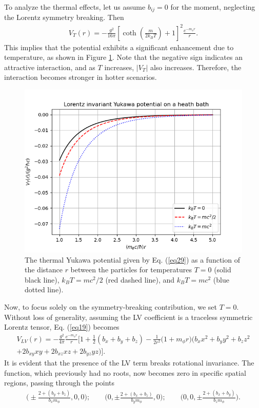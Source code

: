 \documentclass[11pt,showpacs,preprintnumbers,amsmath,amssymb,prd,nofootinbib,superscriptaddress]{revtex4-2}
\begin{document}
{To analyze the thermal effects, let us assume $b_{ij} = 0$ for the moment, neglecting the Lorentz symmetry breaking. Then
\begin{eqnarray}
    V_T(r)=-\frac{g^2 }{16\pi}\left[\coth{\left(\frac{m}{2k_BT}\right)}+1\right]^2\frac{e^{-m_{\phi}r}}{r}.\label{eq29}
\end{eqnarray}
This implies that the potential exhibits a significant enhancement due to temperature, as shown in Figure \ref{fig3}. Note that the negative sign indicates an attractive interaction, and as $T$ increases, $|V_T|$ also increases. Therefore, the interaction becomes stronger in hotter scenarios.
\begin{figure}[ht]
    \centering
\includegraphics[width=0.6\linewidth]{LIThermalPotential.png}
    \caption{The thermal Yukawa potential given by Eq. (\ref{eq29}) as a function of the distance $r$ between the particles for temperatures $T=0$ (solid black line), $k_B T = mc^2 / 2$ (red dashed line), and $k_B T = mc^2$ (blue dotted line).}
    \label{fig3}
\end{figure}

Now, to focus solely on the symmetry-breaking contribution, we set $T=0$. Without loss of generality, assuming the LV coefficient is a traceless symmetric Lorentz tensor, Eq. (\ref{eq19}) becomes
\begin{eqnarray}
    V_{LV}(r)=-\frac{g^2}{4\pi}\frac{e^{-m_{\phi}r}}{r}\biggl[1+\frac{1}{2}(b_{x}+b_{y}+b_{z})-\frac{1}{2r^2}\biggl(1+{m_\phi}r\biggr)\biggl(b_{x}x^2+b_{y}y^2+b_{z}z^2\nonumber\\+2b_{xy}xy+2b_{xz}xz+2b_{yz}yz\biggr)\biggr].
\end{eqnarray}
It is evident that the presence of the LV term breaks rotational invariance. The function, which previously had no roots, now becomes zero in specific spatial regions, passing through the points
\begin{eqnarray}
    \biggl(\pm \frac{2+(b_y+b_z)}{b_x m_\phi},0,0\biggr);\quad\quad \biggl(0,\pm \frac{2+(b_x+b_z)}{b_y m_\phi},0\biggr);\quad\quad \biggl(0,0,\pm \frac{2+(b_x+b_y)}{b_z m_\phi}\biggr).
\end{eqnarray}

}
\end{document}
